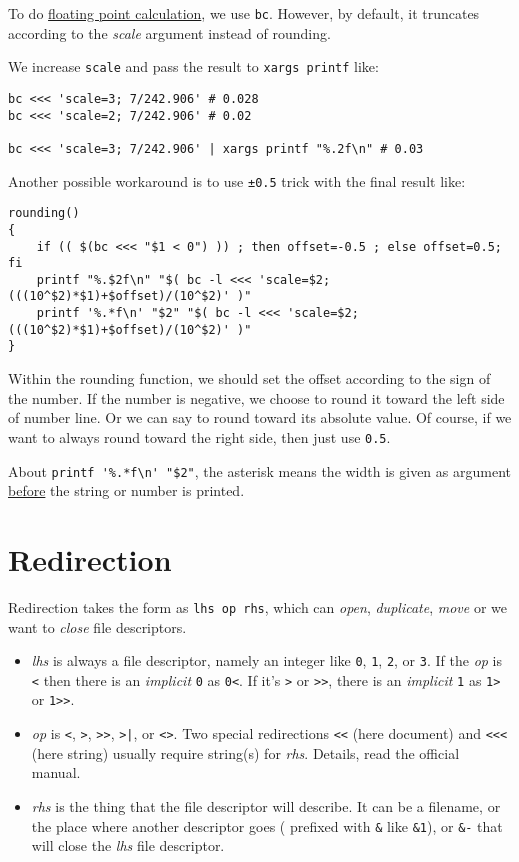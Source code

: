 To do \href{http://mywiki.wooledge.org/BashFAQ/022}{floating point
  calculation}, we use \lstinline|bc|. However, by default, it
truncates according to the \textit{scale} argument instead of
rounding.

We increase \lstinline|scale| and pass the result to
\lstinline|xargs printf| like:

\begin{lstlisting}
bc <<< 'scale=3; 7/242.906' # 0.028
bc <<< 'scale=2; 7/242.906' # 0.02

bc <<< 'scale=3; 7/242.906' | xargs printf "%.2f\n" # 0.03
\end{lstlisting}

Another possible workaround is to use \verb|±0.5| trick with the final
result like:

\begin{lstlisting}
rounding()
{
    if (( $(bc <<< "$1 < 0") )) ; then offset=-0.5 ; else offset=0.5; fi
    printf "%.$2f\n" "$( bc -l <<< 'scale=$2; (((10^$2)*$1)+$offset)/(10^$2)' )"
    printf '%.*f\n' "$2" "$( bc -l <<< 'scale=$2; (((10^$2)*$1)+$offset)/(10^$2)' )"
}
\end{lstlisting}

Within the rounding function, we should set the offset according
to the sign of the number. If the number is negative, we choose to
round it toward the left side of number line. Or we can say to
round toward its absolute value. Of course, if we want to always
round toward the right side, then just use \verb|0.5|.

About \lstinline|printf '%.*f\n' "$2"|, the asterisk means the width
is given as argument
\href{https://wiki.bash-hackers.org/commands/builtin/printf?s\%5b\%5d=printf}{before}
the string or number is printed.

\section{Redirection}
\label{sec:bash-redirection}

Redirection takes the form as \verb|lhs op rhs|, which can
\textit{open}, \textit{duplicate}, \textit{move} or we want to
\textit{close} file descriptors.

\begin{itemize}
\item \textit{lhs} is always a file descriptor, namely an integer
  like \verb|0|, \verb|1|, \verb|2|, or \verb|3|. If the
  \textit{op} is \verb|<| then there is an \textit{implicit}
  \verb|0| as \verb|0<|. If it's \verb|>| or \verb|>>|, there is
  an \textit{implicit} \verb|1| as \verb|1>| or \verb|1>>|.
\item \textit{op} is \verb|<|, \verb|>|, \verb|>>|, \verb/>|/, or
  \verb|<>|. Two special redirections \verb|<<| (here document)
  and \verb|<<<| (here string) usually require string(s) for
  \textit{rhs}. Details, read the official manual.
\item \textit{rhs} is the thing that the file descriptor will
  describe. It can be a filename, or the place where another
  descriptor goes ( prefixed with \verb|&| like \lstinline|&1|),
  or \lstinline|&-| that will close the \textit{lhs} file
  descriptor.
\end{itemize}

